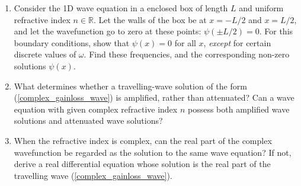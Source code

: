\documentclass[10pt,a4paper]{article}
\begin{document}
\begin{enumerate}
\item
Consider the 1D wave equation in a enclosed box of length $L$ and
uniform refractive index $n\in\mathbb{R}$. Let the walls of the box be
at $x = -L/2$ and $x = L/2$, and let the wavefunction go to zero at
these points: $\psi(\pm L/2) = 0$. For this boundary conditions, show
that $\psi(x) = 0$ for all $x$, \emph{except} for certain discrete
values of $\omega$. Find these frequencies, and the corresponding
non-zero solutions $\psi(x)$.

\item
What determines whether a travelling-wave solution of the form
(\ref{complex_gainloss_wave}) is amplified, rather than attenuated?
Can a wave equation with given complex refractive index $n$ possess
both amplified wave solutions and attenuated wave solutions?

\item
When the refractive index is complex, can the real part of the complex
wavefunction be regarded as the solution to the same wave equation?
If not, derive a real differential equation whose solution is the real
part of the travelling wave (\ref{complex_gainloss_wave}).

\end{enumerate}
\end{document}

